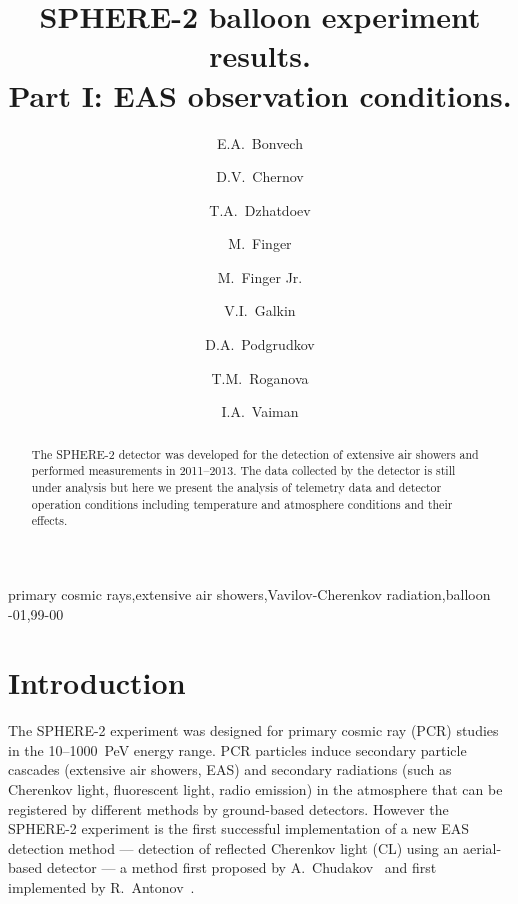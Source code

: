 \documentclass[final,5p,times,twocolumn]{elsarticle}
\begin{document}

\linenumbers

\begin{frontmatter}
\title{SPHERE-2 balloon experiment results.\\ Part I: EAS observation conditions.}


\author[address1]{E.A.~Bonvech}
\author[address1]{D.V.~Chernov}
\author[address1]{T.A.~Dzhatdoev}
\author[address2,address3]{M.~Finger}
\author[address2,address3]{M.~Finger Jr.}
\author[address4]{V.I.~Galkin}
\author[address4,address1]{D.A.~Podgrudkov}
\author[address1]{T.M.~Roganova}
\author[address4,address1]{I.A.~Vaiman}
\address[address1]{M.V. Lomonosov Moscow State University, Skobeltsyn Institute of Nuclear Physics (SINP MSU), Moscow, Russia}
\address[address2]{Charles University, Faculty of Mathematics and Physics, Prague, Czech Republic}
\address[address3]{Joint Institute for Nuclear Research, Dubna, Russian Federation}
\address[address4]{M.V. Lomonosov Moscow State University, Faculty of Physics, Moscow, Russia}

\begin{abstract}
The SPHERE-2 detector was developed for the detection of extensive air showers and performed measurements in 2011--2013. The data collected by the detector is still under analysis but here we present the analysis of telemetry data and detector operation conditions including temperature and atmosphere conditions and their effects.
\end{abstract}

\begin{keyword}
primary cosmic rays\sep extensive air showers\sep Vavilov-Cherenkov radiation\sep balloon
-01\sep  99-00
\end{keyword}
\end{frontmatter}

\section{Introduction}
The SPHERE-2 experiment was designed for primary cosmic ray (PCR) studies in the 10--1000~PeV energy range. PCR particles induce secondary particle cascades (extensive air showers, EAS) and secondary radiations (such as Cherenkov light, fluorescent light, radio emission) in the atmosphere that can be registered by different methods by ground-based detectors. However the SPHERE-2 experiment is the first successful implementation of a new EAS detection method --- detection of reflected Cherenkov light (CL) using an aerial-based detector --- a method first proposed by A.~Chudakov~\cite{chu74:VKKL74} and first implemented by R.~Antonov~\cite{ant75, ant86, ant97, Ant15a}.
\end{document}
